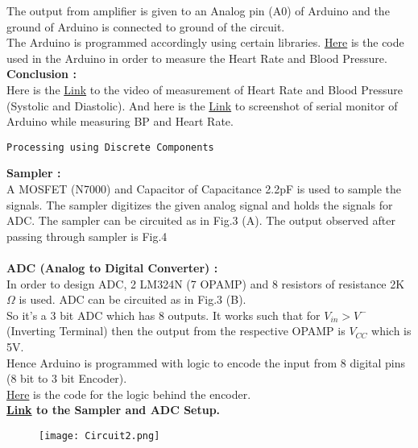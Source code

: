 \documentclass{homework}
\begin{document}
The output from amplifier is given to an Analog pin (A0) of Arduino and the ground of Arduino is connected to ground of the circuit.\\
The Arduino is programmed accordingly using certain libraries. \href{https://github.com/TEJADHITH/bpm_bp_measurement/blob/main/using_arduino.ino}{Here} is the code used in the Arduino in order to measure the Heart Rate and Blood Pressure.\\
\textbf{Conclusion :}\\
Here is the \href{https://drive.google.com/file/d/1NNSSBI55vghyBbqjyvGRnKfu3BkBh4d0/view?usp=share_link}{Link} to the video of measurement of Heart Rate and Blood Pressure (Systolic and Diastolic). And here is the \href{https://drive.google.com/file/d/1Xyi8ULlUVJIfOv-L8Huq1mbdpNMJOM5w/view?usp=share_link}{Link} to screenshot of serial monitor of Arduino while measuring BP and Heart Rate.
\begin{center}
    \large{\texttt{Processing using Discrete Components}}\\
\end{center}
\textbf{Sampler :}\\
A MOSFET (N7000) and Capacitor of Capacitance 2.2pF is used to sample the signals. The sampler digitizes the given analog signal and holds the signals for ADC. The sampler can be circuited as in Fig.3 (A). The output observed after passing through sampler is Fig.4\\
 \\
\textbf{ADC (Analog to Digital Converter) :}\\
In order to design ADC, 2 LM324N (7 OPAMP) and 8 resistors of resistance 2K$\Omega$ is used. ADC can be circuited as in Fig.3 (B).\\
So it's a 3 bit ADC which has 8 outputs. It works such that for $V_{in}>V^-$(Inverting Terminal) then the output from the respective OPAMP is $V_{CC}$ which is 5V.\\
Hence Arduino is programmed with logic to encode the input from 8 digital pins (8 bit to 3 bit Encoder).\\
\href{https://github.com/TEJADHITH/bpm_bp_measurement/blob/main/using_components.ino}{Here} is the code for the logic behind the encoder.\\
\textbf{\href{https://drive.google.com/file/d/1Nff5NuQ25jewDKzhwKrg-UZLwyj3tnhR/view?usp=sharing}{Link} to the Sampler and ADC Setup.}
\begin{figure}[h]
    \centering
    \texttt{[image: Circuit2.png]}
\end{figure}
\end{document}

